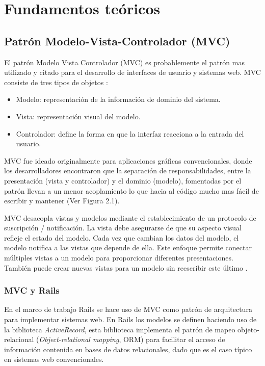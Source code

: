\chapter{Fundamentos teóricos}

\section{Patrón Modelo-Vista-Controlador (MVC)}
El patrón Modelo Vista Controlador (MVC) es probablemente el patrón
mas utilizado y citado para el desarrollo de interfaces de usuario y sistemas web.
MVC consiste de tres tipos de objetos \cite{22_martin_fowler_mvc}:

\begin{itemize}
\item Modelo: representación de la información de dominio del sistema.
\item Vista: representación visual del modelo.
\item Controlador: define la forma en que la interfaz reacciona a la entrada
  del usuario.
\end{itemize}


MVC fue ideado originalmente para aplicaciones gráficas convencionales,
donde los desarrolladores encontraron que la separación de responsabilidades,
entre la presentación (vista y controlador) y el dominio (modelo), fomentadas
por el patrón llevan a un menor acoplamiento lo que hacia al código
mucho mas fácil de escribir y mantener (Ver Figura 2.1).

MVC desacopla vistas y modelos mediante el establecimiento de un
protocolo de suscripción / notificación. La vista debe asegurarse
de que su aspecto visual refleje el estado del modelo. Cada vez que cambian
los datos del modelo, el modelo notifica a las vistas que depende de ella.
Este enfoque permite conectar múltiples vistas a un modelo para proporcionar
diferentes presentaciones. También puede crear nuevas vistas para un modelo
sin reescribir este último \cite{14_gamma_1995}.

\subsection{MVC y Rails}
En el marco de trabajo Rails se hace uso de MVC como patrón de arquitectura
para implementar sistemas web. En Rails los modelos se definen haciendo
uso de la biblioteca \textit{ActiveRecord}, esta biblioteca implementa el
patrón de mapeo objeto-relacional (\textit{Object-relational mapping},
ORM) para facilitar el acceso de información contenida en
bases de datos relacionales, dado que es el caso típico en sistemas web
convencionales.

